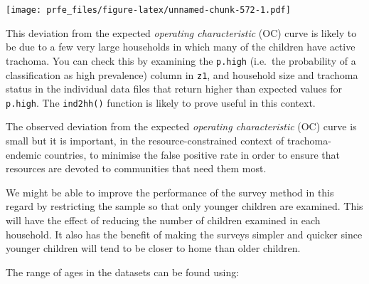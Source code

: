 \documentclass[12pt,a4paper]{book}
\newenvironment{Shaded}{\begin{snugshade}}{\end{snugshade}}
\newcommand{\KeywordTok}[1]{\textcolor[rgb]{0.13,0.29,0.53}{\textbf{#1}}}
\newcommand{\DataTypeTok}[1]{\textcolor[rgb]{0.13,0.29,0.53}{#1}}
\newcommand{\CharTok}[1]{\textcolor[rgb]{0.31,0.60,0.02}{#1}}
\newcommand{\StringTok}[1]{\textcolor[rgb]{0.31,0.60,0.02}{#1}}
\newcommand{\OtherTok}[1]{\textcolor[rgb]{0.56,0.35,0.01}{#1}}
\newcommand{\ControlFlowTok}[1]{\textcolor[rgb]{0.13,0.29,0.53}{\textbf{#1}}}
\newcommand{\OperatorTok}[1]{\textcolor[rgb]{0.81,0.36,0.00}{\textbf{#1}}}
\newcommand{\NormalTok}[1]{#1}
\theoremstyle{definition}
\theoremstyle{definition}
\theoremstyle{definition}
\theoremstyle{remark}
\begin{document}
\texttt{[image: prfe\_files/figure-latex/unnamed-chunk-572-1.pdf]}

This deviation from the expected \emph{operating characteristic} (OC)
curve is likely to be due to a few very large households in which many
of the children have active trachoma. You can check this by examining
the \texttt{p.high} (i.e.~the probability of a classification as high
prevalence) column in \texttt{z1}, and household size and trachoma
status in the individual data files that return higher than expected
values for \texttt{p.high}. The \texttt{ind2hh()} function is likely to
prove useful in this context.

The observed deviation from the expected \emph{operating characteristic}
(OC) curve is small but it is important, in the resource-constrained
context of trachoma-endemic countries, to minimise the false positive
rate in order to ensure that resources are devoted to communities that
need them most.

We might be able to improve the performance of the survey method in this
regard by restricting the sample so that only younger children are
examined. This will have the effect of reducing the number of children
examined in each household. It also has the benefit of making the
surveys simpler and quicker since younger children will tend to be
closer to home than older children.

The range of ages in the datasets can be found using:

\begin{Shaded}
\end{Shaded}
\end{document}
